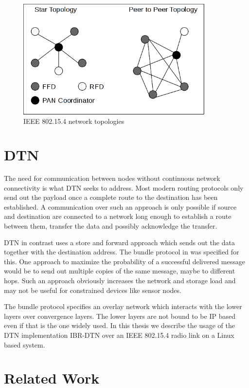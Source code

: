 \begin{figure}
  \begin{center}
    \includegraphics[height=6cm]{images/802154topology}
    \caption{IEEE 802.15.4 network topologies}
        \label{fig:802154topologies}
  \end{center}
\end{figure}

\section{DTN}
\label{introdtn}
The need for communication between nodes without continuous network
connectivity is what DTN seeks to address. Most modern routing protocols only
send out the payload once a complete route to the destination has been established.
A communication over such an approach is only possible if source and destination
are connected to a network long enough to establish a route between them,
transfer the data and possibly acknowledge the transfer.

DTN in contrast uses a store and forward approach which sends out the data
together with the destination address. The bundle protocol in
\cite{RFC5050} was specified for this. One approach to maximize the probability
of a successful delivered message would be to send out multiple copies of the
same message, maybe to different hops. Such an approach obviously increases the
network and storage load and may not be useful for constrained devices like
sensor nodes.

The bundle protocol specifies an overlay network which interacts with the lower
layers over convergence layers. The lower layers are not bound to be IP
based even if that is the one widely used. In this thesis we describe the usage
of the DTN implementation IBR-DTN over an IEEE 802.15.4 radio link on a Linux
based system.

\section{Related Work}
\label{relatedwork}


